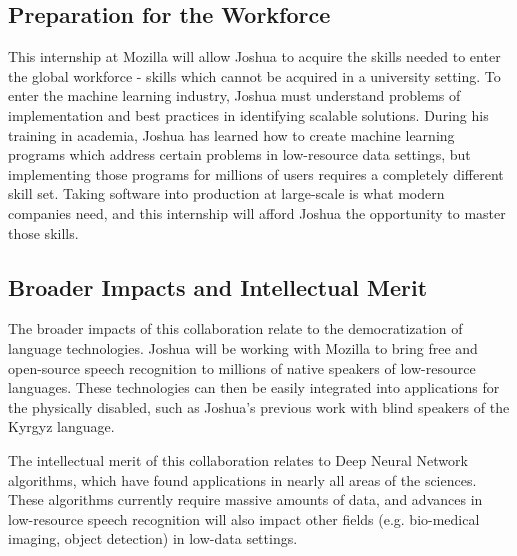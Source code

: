 \documentclass[12pt,a4paper]{article}
\begin{document}
\subsection*{Preparation for the Workforce}

This internship at Mozilla will allow Joshua to acquire the skills needed to enter the global workforce - skills which cannot be acquired in a university setting. To enter the machine learning industry, Joshua must understand problems of implementation and best practices in identifying scalable solutions. During his training in academia, Joshua has learned how to create machine learning programs which address certain problems in low-resource data settings, but implementing those programs for millions of users requires a completely different skill set. Taking software into production at large-scale is what modern companies need, and this internship will afford Joshua the opportunity to master those skills.  

\subsection*{Broader Impacts and Intellectual Merit}

The broader impacts of this collaboration relate to the democratization of language technologies. Joshua will be working with Mozilla to bring free and open-source speech recognition to millions of native speakers of low-resource languages. These technologies can then be easily integrated into applications for the physically disabled, such as Joshua's previous work with blind speakers of the Kyrgyz language.

The intellectual merit of this collaboration relates to Deep Neural Network algorithms, which have found applications in nearly all areas of the sciences. These algorithms currently require massive amounts of data, and advances in low-resource speech recognition will also impact other fields (e.g. bio-medical imaging, object detection) in low-data settings.
\end{document}
